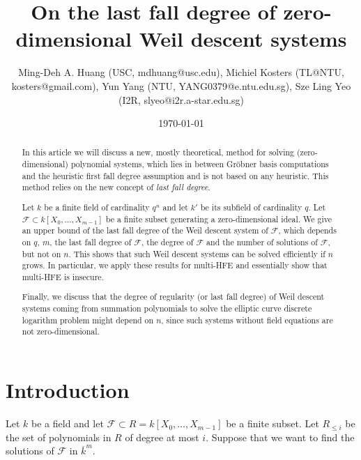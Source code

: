 \documentclass{amsart}
\theoremstyle{plain}
\theoremstyle{definition}
\begin{document}
\title[]{On the last fall degree of zero-dimensional Weil descent systems}
\author[]{Ming-Deh A. Huang (USC, mdhuang@usc.edu), Michiel Kosters (TL@NTU, kosters@gmail.com), Yun Yang (NTU, YANG0379@e.ntu.edu.sg), Sze Ling Yeo (I2R, slyeo@i2r.a-star.edu.sg)}
\address{}
\email{}
\urladdr{}
\date{\today}

\maketitle

\begin{abstract}
In this article we will discuss a new, mostly theoretical, method for solving (zero-dimensional) polynomial systems, which lies in between Gr\"obner basis computations and the heuristic first fall degree assumption and is not based on any heuristic. This method relies on the new concept of \emph{last fall degree}.

Let $k$ be a finite field of cardinality $q^n$ and let $k'$ be its subfield of cardinality $q$. Let $\mathcal{F} \subset k[X_0,\ldots,X_{m-1}]$ be a finite subset generating a zero-dimensional ideal. We give an upper bound of the last fall degree of the Weil descent system of $\mathcal{F}$, which depends on $q$, $m$, the last fall degree of $\mathcal{F}$, the degree of $\mathcal{F}$ and the number of solutions of $\mathcal{F}$, but not on $n$. This shows that such Weil descent systems can be solved efficiently if $n$ grows. In particular, we apply these results for multi-HFE and essentially show that multi-HFE is insecure.

Finally, we discuss that the degree of regularity (or last fall degree) of Weil descent systems coming from summation polynomials to solve the elliptic curve discrete logarithm problem might depend on $n$, since such systems without field equations are not zero-dimensional. 
\end{abstract}

\section{Introduction}
Let $k$ be a field and let $\mathcal{F} \subset R=k[X_0,\ldots,X_{m-1}]$ be a finite subset. Let $R_{\leq i}$ be the set of polynomials in $R$ of degree at most $i$. Suppose that we want to find the solutions of $\mathcal{F}$ in $\overline{k}^m$. 
\end{document}
